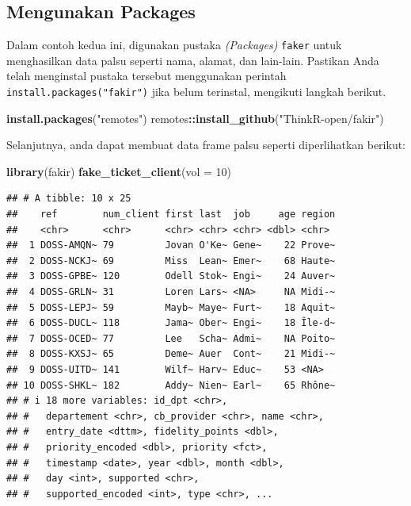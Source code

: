 \documentclass[
]{book}
\newenvironment{Shaded}{\begin{snugshade}}{\end{snugshade}}
\newcommand{\AttributeTok}[1]{\textcolor[rgb]{0.13,0.29,0.53}{#1}}
\newcommand{\DecValTok}[1]{\textcolor[rgb]{0.00,0.00,0.81}{#1}}
\newcommand{\FunctionTok}[1]{\textcolor[rgb]{0.13,0.29,0.53}{\textbf{#1}}}
\newcommand{\NormalTok}[1]{#1}
\newcommand{\SpecialCharTok}[1]{\textcolor[rgb]{0.81,0.36,0.00}{\textbf{#1}}}
\newcommand{\StringTok}[1]{\textcolor[rgb]{0.31,0.60,0.02}{#1}}
\begin{document}
\hypertarget{mengunakan-packages}{%
\subsection{Mengunakan Packages}\label{mengunakan-packages}}

Dalam contoh kedua ini, digunakan pustaka \emph{(Packages)} \texttt{faker} untuk menghasilkan data palsu seperti nama, alamat, dan lain-lain. Pastikan Anda telah menginstal pustaka tersebut menggunakan perintah \texttt{install.packages("fakir")} jika belum terinstal, mengikuti langkah berikut.

\begin{Shaded}
\begin{Highlighting}[]
\FunctionTok{install.packages}\NormalTok{(}\StringTok{"remotes"}\NormalTok{)}
\NormalTok{remotes}\SpecialCharTok{::}\FunctionTok{install\_github}\NormalTok{(}\StringTok{"ThinkR{-}open/fakir"}\NormalTok{)}
\end{Highlighting}
\end{Shaded}

Selanjutnya, anda dapat membuat data frame palsu seperti diperlihatkan berikut:

\begin{Shaded}
\begin{Highlighting}[]
\FunctionTok{library}\NormalTok{(fakir)}
\FunctionTok{fake\_ticket\_client}\NormalTok{(}\AttributeTok{vol =} \DecValTok{10}\NormalTok{)}
\end{Highlighting}
\end{Shaded}

\begin{verbatim}
## # A tibble: 10 x 25
##    ref        num_client first last  job     age region
##    <chr>      <chr>      <chr> <chr> <chr> <dbl> <chr> 
##  1 DOSS-AMQN~ 79         Jovan O'Ke~ Gene~    22 Prove~
##  2 DOSS-NCKJ~ 69         Miss  Lean~ Emer~    68 Haute~
##  3 DOSS-GPBE~ 120        Odell Stok~ Engi~    24 Auver~
##  4 DOSS-GRLN~ 31         Loren Lars~ <NA>     NA Midi-~
##  5 DOSS-LEPJ~ 59         Mayb~ Maye~ Furt~    18 Aquit~
##  6 DOSS-DUCL~ 118        Jama~ Ober~ Engi~    18 Île-d~
##  7 DOSS-OCED~ 77         Lee   Scha~ Admi~    NA Poito~
##  8 DOSS-KXSJ~ 65         Deme~ Auer  Cont~    21 Midi-~
##  9 DOSS-UITD~ 141        Wilf~ Harv~ Educ~    53 <NA>  
## 10 DOSS-SHKL~ 182        Addy~ Nien~ Earl~    65 Rhône~
## # i 18 more variables: id_dpt <chr>,
## #   departement <chr>, cb_provider <chr>, name <chr>,
## #   entry_date <dttm>, fidelity_points <dbl>,
## #   priority_encoded <dbl>, priority <fct>,
## #   timestamp <date>, year <dbl>, month <dbl>,
## #   day <int>, supported <chr>,
## #   supported_encoded <int>, type <chr>, ...
\end{verbatim}
\end{document}
